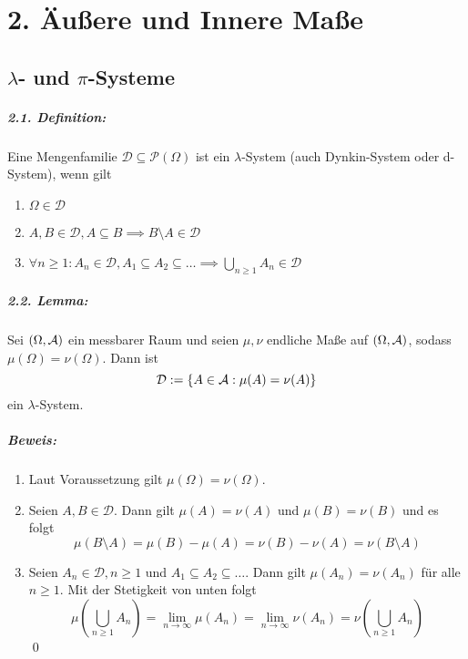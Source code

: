 \documentclass[12pt]{report}
\begin{document}
\chapter*{2. \"Au\ss{}ere und Innere Ma\ss{}e}

\section*{$\lambda$- und $\pi$-Systeme}

\paragraph{2.1. Definition:}Eine Mengenfamilie $\mathcal{D}\subseteq\mathcal{P}(\Omega)$ ist ein $\lambda$-System (auch Dynkin-System oder d-System), wenn gilt
\begin{enumerate}[label=(\roman*)]
    \item $\Omega\in\mathcal{D}$
    \item $A,B\in\mathcal{D},A\subseteq B\implies B\setminus A\in\mathcal{D}$
    \item $\forall n\geq1:A_n\in\mathcal{D},A_1\subseteq A_2\subseteq\hdots\implies\displaystyle\bigcup_{n\geq1}A_n\in\mathcal{D}$
\end{enumerate}

\paragraph{2.2. Lemma:}Sei $(\Omega,\mathcal{A})$ ein messbarer Raum und seien $\mu,\nu$ endliche Ma\ss{}e auf $(\Omega,\mathcal{A})$, sodass $\mu(\Omega)=\nu(\Omega)$. Dann ist 
$$\mathcal{D}:=\{A\in\mathcal{A}:\mu(A)=\nu(A)\}$$
ein $\lambda$-System.

\paragraph{Beweis:}
\begin{enumerate}[label=(\roman*)]
    \item Laut Voraussetzung gilt $\mu(\Omega)=\nu(\Omega)$.
    \item Seien $A,B\in\mathcal{D}$. Dann gilt $\mu(A)=\nu(A)$ und $\mu(B)=\nu(B)$ und es folgt
    $$\mu(B\setminus A)=\mu(B)-\mu(A)=\nu(B)-\nu(A)=\nu(B\setminus A)$$
    \item Seien $A_n\in\mathcal{D},n\geq1$ und $A_1\subseteq A_2\subseteq\hdots$. Dann gilt $\mu(A_n)=\nu(A_n)$ f\"ur alle $n\geq1$. Mit der Stetigkeit von unten folgt 
    $$\mu\left(\bigcup_{n\geq1}A_n\right)=\lim_{n\to\infty}\mu(A_n)=\lim_{n\to\infty}\nu(A_n)=\nu\left(\bigcup_{n\geq1}A_n\right)$$
    \qed
\end{enumerate}
\end{document}
